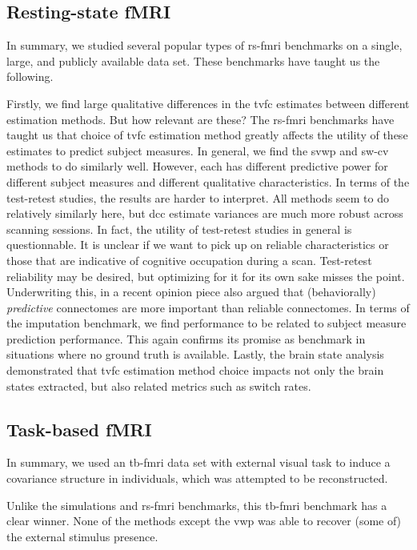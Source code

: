 \subsection{Resting-state fMRI}
\label{subsec:benchmarking-discussion-rs-fmri}

In summary, we studied several popular types of \gls{rs-fmri} benchmarks on a single, large, and publicly available data set.
These benchmarks have taught us the following.

Firstly, we find large qualitative differences in the \gls{tvfc} estimates between different estimation methods.
But how relevant are these?
%
The \gls{rs-fmri} benchmarks have taught us that choice of \gls{tvfc} estimation method greatly affects the utility of these estimates to predict subject measures.
In general, we find the \gls{svwp} and \gls{sw-cv} methods to do similarly well.
However, each has different predictive power for different subject measures and different qualitative characteristics.
%
In terms of the test-retest studies, the results are harder to interpret.
All methods seem to do relatively similarly here, but \gls{dcc} estimate variances are much more robust across scanning sessions.
In fact, the utility of test-retest studies in general is questionnable.
It is unclear if we want to pick up on reliable characteristics or those that are indicative of cognitive occupation during a scan.
Test-retest reliability may be desired, but optimizing for it for its own sake misses the point.
Underwriting this, in a recent opinion piece \textcite{Finn2021b} also argued that (behaviorally) \emph{predictive} connectomes are more important than reliable connectomes.
%
In terms of the imputation benchmark, we find performance to be related to subject measure prediction performance.
This again confirms its promise as benchmark in situations where no ground truth is available.
%
Lastly, the brain state analysis demonstrated that \gls{tvfc} estimation method choice impacts not only the brain states extracted, but also related metrics such as switch rates.

\subsection{Task-based fMRI}

In summary, we used an \gls{tb-fmri} data set with external visual task to induce a covariance structure in individuals, which was attempted to be reconstructed.

Unlike the simulations and \gls{rs-fmri} benchmarks, this \gls{tb-fmri} benchmark has a clear winner.
None of the methods except the \gls{vwp} was able to recover (some of) the external stimulus presence.


